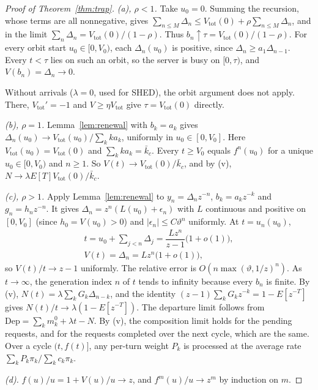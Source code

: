 \begin{proof}[Proof of Theorem~\ref{thm:trap}]
\emph{(a), $\rho<1$.} Take $u_0=0$. Summing the recursion, whose terms are all nonnegative, gives
$\sum_{n\le M}\Delta_n\le V_{\mathrm{tot}}(0)+\rho\sum_{n\le M}\Delta_n$, and in the limit
$\sum_n\Delta_n=V_{\mathrm{tot}}(0)/(1-\rho)$. Thus $b_n\uparrow\tau=V_{\mathrm{tot}}(0)/(1-\rho)$. For every orbit start
$u_0\in[0,V_0)$, each $\Delta_n(u_0)$ is positive, since $\Delta_n\ge a_1\Delta_{n-1}$. Every $t<\tau$ lies on such an
orbit, so the server is busy on $[0,\tau)$, and $V(b_n)=\Delta_n\to0$.

Without arrivals ($\lambda=0$, used for SHED), the orbit argument does not apply. There, $V_{\mathrm{tot}}'=-1$ and
$V\ge\eta V_{\mathrm{tot}}$ give $\tau=V_{\mathrm{tot}}(0)$ directly.

\emph{(b), $\rho=1$.} Lemma~\ref{lem:renewal} with $b_k=a_k$ gives $\Delta_n(u_0)\to V_{\mathrm{tot}}(u_0)/\sum_kka_k$,
uniformly in $u_0\in[0,V_0]$. Here $V_{\mathrm{tot}}(u_0)=V_{\mathrm{tot}}(0)$ and $\sum_kka_k=\bar k_c$. Every
$t\ge V_0$ equals $f^n(u_0)$ for a unique $u_0\in[0,V_0)$ and $n\ge1$. So
$V(t)\to V_{\mathrm{tot}}(0)/\bar k_c$, and by (v), $N\to\lambda E[T]V_{\mathrm{tot}}(0)/\bar k_c$.

\emph{(c), $\rho>1$.} Apply Lemma~\ref{lem:renewal} to $y_n=\Delta_nz^{-n}$, $b_k=a_kz^{-k}$ and $g_n=h_nz^{-n}$. It gives
$\Delta_n=z^n(L(u_0)+\epsilon_n)$ with $L$ continuous and positive on $[0,V_0]$ (since $h_0=V(u_0)>0$) and
$|\epsilon_n|\le C\vartheta^n$ uniformly. At $t=u_n(u_0)$,
\begin{gather*}
t=u_0+\textstyle\sum_{j<n}\Delta_j=\dfrac{Lz^n}{z-1}\bigl(1+o(1)\bigr),\\
V(t)=\Delta_n=Lz^n\bigl(1+o(1)\bigr),
\end{gather*}
so $V(t)/t\to z-1$ uniformly. The relative error is $O(n\max(\vartheta,1/z)^n)$. As $t\to\infty$, the generation index $n$
of $t$ tends to infinity because every $b_n$ is finite. By (v), $N(t)=\lambda\sum_kG_k\Delta_{n-k}$, and the identity
$(z-1)\sum_kG_kz^{-k}=1-E[z^{-T}]$ gives $N(t)/t\to\lambda(1-E[z^{-T}])$. The departure limit follows from
$\mathrm{Dep}=\sum_km_k^0+\lambda t-N$. By (v), the composition limit holds for the pending requests, and for the requests
completed over the next cycle, which are the same. Over a cycle $(t,f(t)]$, any per-turn weight $P_k$ is processed at the
average rate $\sum_kP_k\pi_k/\sum_kc_k\pi_k$.

\emph{(d).} $f(u)/u=1+V(u)/u\to z$, and $f^m(u)/u\to z^m$ by induction on $m$.


\end{proof}
